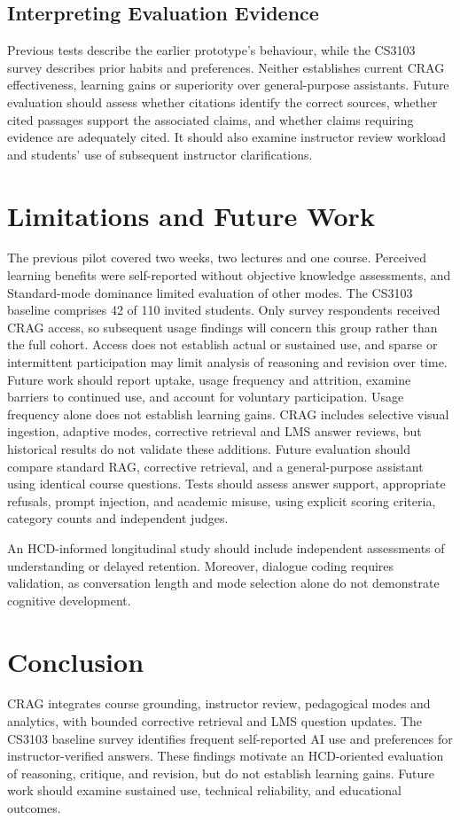 \documentclass[conference]{IEEEtran}
\begin{document}
\subsection{Interpreting Evaluation Evidence}
Previous tests describe the earlier prototype's behaviour, while the CS3103 survey describes prior habits and preferences. Neither establishes current CRAG effectiveness, learning gains or superiority over general-purpose assistants. Future evaluation should assess whether citations identify the correct sources, whether cited passages support the associated claims, and whether claims requiring evidence are adequately cited. It should also examine instructor review workload and students' use of subsequent instructor clarifications.

\section{Limitations and Future Work}
The previous pilot covered two weeks, two lectures and one course. Perceived learning benefits were self-reported without objective knowledge assessments, and Standard-mode dominance limited evaluation of other modes. 
The CS3103 baseline comprises 42 of 110 invited students. Only survey respondents received CRAG access, so subsequent usage findings will concern this group rather than the full cohort. Access does not establish actual or sustained use, and sparse or intermittent participation may limit analysis of reasoning and revision over time. Future work should report uptake, usage frequency and attrition, examine barriers to continued use, and account for voluntary participation. Usage frequency alone does not establish learning gains.
CRAG includes selective visual ingestion, adaptive modes, corrective retrieval and LMS answer reviews, but historical results do not validate these additions. Future evaluation should compare standard RAG, corrective retrieval, and a general-purpose assistant using identical course questions. Tests should assess answer support, appropriate refusals, prompt injection, and academic misuse, using explicit scoring criteria, category counts and independent judges.

An HCD-informed longitudinal study should include independent assessments of understanding or delayed retention. Moreover, dialogue coding requires validation, as conversation length and mode selection alone do not demonstrate cognitive development.

\section{Conclusion}
CRAG integrates course grounding, instructor review, pedagogical modes and analytics, with bounded corrective retrieval and LMS question updates. The CS3103 baseline survey identifies frequent self-reported AI use and preferences for instructor-verified answers. These findings motivate an HCD-oriented evaluation of reasoning, critique, and revision, but do not establish learning gains. Future work should examine sustained use, technical reliability, and educational outcomes.
\end{document}
